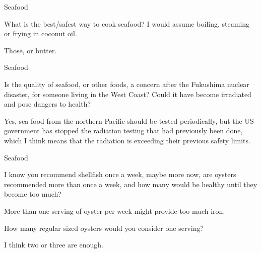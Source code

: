 \documentclass[11pt,oneside,openany,extrafontsizes]{memoir}
\begin{document}
\begin{qaexchange}{Seafood}

    \begin{question}
        What is the best/safest way to cook seafood? I would assume boiling, steaming or frying in coconut oil.
    \end{question}

    \begin{answer}
        Those, or butter.
    \end{answer}
\end{qaexchange}

\begin{qaexchange}{Seafood}

    \begin{question}
        Is the quality of seafood, or other foods, a concern after the Fukushima nuclear disaster, for someone living in the West Coast? Could it have become irradiated and pose dangers to health?
    \end{question}

    \begin{answer}
        Yes, sea food from the northern Pacific should be tested periodically, but the US government has stopped the radiation testing that had previously been done, which I think means that the radiation is exceeding their previous safety limits.
    \end{answer}
\end{qaexchange}

\begin{emailexchange}{Seafood}

    \begin{question}
        I know you recommend shellfish once a week, maybe more now, are oysters recommended more than once a week, and how many would be healthy until they become too much?
    \end{question}

    \begin{answer}
        More than one serving of oyster per week might provide too much iron.
    \end{answer}

    \begin{question}
        How many regular sized oysters would you consider one serving?
    \end{question}

    \begin{answer}
        I think two or three are enough.
    \end{answer}
\end{emailexchange}
\end{document}
